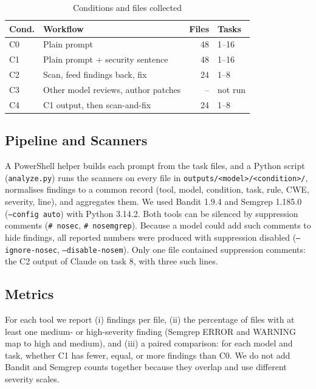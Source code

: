 \documentclass[conference]{IEEEtran}
\begin{document}
\begin{table}[t]
\caption{Conditions and files collected}
\label{tab:conditions}
\centering
\footnotesize
\begin{tabular}{@{}llrl@{}}
\toprule
Cond. & Workflow & Files & Tasks \\
\midrule
C0 & Plain prompt & 48 & 1--16 \\
C1 & Plain prompt + security sentence & 48 & 1--16 \\
C2 & Scan, feed findings back, fix & 24 & 1--8 \\
C3 & Other model reviews, author patches & -- & not run \\
C4 & C1 output, then scan-and-fix & 24 & 1--8 \\
\bottomrule
\end{tabular}
\end{table}

\subsection{Pipeline and Scanners}
A PowerShell helper builds each prompt from the task files, and a Python script (\texttt{analyze.py}) runs the scanners on every file in \texttt{outputs/<model>/<condition>/}, normalises findings to a common record (tool, model, condition, task, rule, CWE, severity, line), and aggregates them. We used Bandit 1.9.4 and Semgrep 1.185.0 (\texttt{--config auto}) with Python 3.14.2. Both tools can be silenced by suppression comments (\texttt{\# nosec}, \texttt{\# nosemgrep}). Because a model could add such comments to hide findings, all reported numbers were produced with suppression disabled (\texttt{--ignore-nosec}, \texttt{--disable-nosem}). Only one file contained suppression comments: the C2 output of Claude on task 8, with three such lines.

\subsection{Metrics}
For each tool we report (i) findings per file, (ii) the percentage of files with at least one medium- or high-severity finding (Semgrep ERROR and WARNING map to high and medium), and (iii) a paired comparison: for each model and task, whether C1 has fewer, equal, or more findings than C0. We do not add Bandit and Semgrep counts together because they overlap and use different severity scales.
\end{document}
